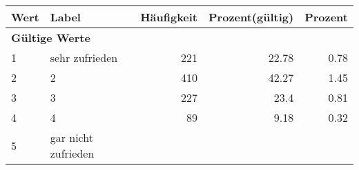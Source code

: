      \begin{longtable}{lXrrr}
     \toprule
     \textbf{Wert} & \textbf{Label} & \textbf{Häufigkeit} & \textbf{Prozent(gültig)} & \textbf{Prozent} \\
     \endhead
     \midrule
     \multicolumn{5}{l}{\textbf{Gültige Werte}}\\

     1 &
     \multicolumn{1}{X}{ sehr zufrieden   } &


       \num{221} &
       \num[round-mode=places,round-precision=2]{22.78} &
         \num[round-mode=places,round-precision=2]{0.78} \\

     2 &
     \multicolumn{1}{X}{ 2   } &


       \num{410} &
       \num[round-mode=places,round-precision=2]{42.27} &
         \num[round-mode=places,round-precision=2]{1.45} \\

     3 &
     \multicolumn{1}{X}{ 3   } &


       \num{227} &
       \num[round-mode=places,round-precision=2]{23.4} &
         \num[round-mode=places,round-precision=2]{0.81} \\

     4 &
     \multicolumn{1}{X}{ 4   } &


       \num{89} &
       \num[round-mode=places,round-precision=2]{9.18} &
         \num[round-mode=places,round-precision=2]{0.32} \\

     5 &
     \multicolumn{1}{X}{ gar nicht zufrieden   } &



\end{longtable}
